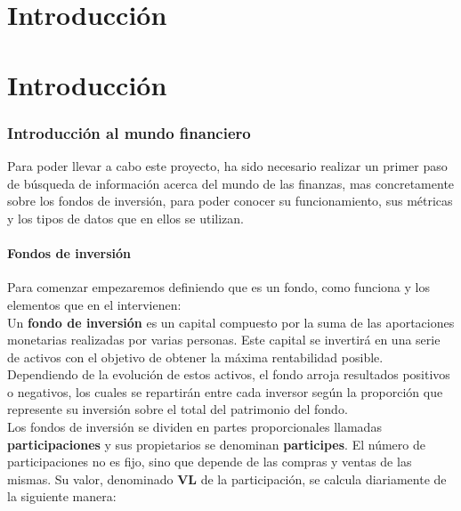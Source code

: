 \documentclass[12pt, a4paper]{article}
\newcommand*\parttitle{}
\let\origpart\part
\renewcommand*{\part}[2][]{%
	\ifx\\#1\\%
	\origpart{#2}%
	\renewcommand*\parttitle{#2}%
	\else
	\origpart[#1]{#2}%
	\renewcommand*\parttitle{#1}%
	\fi
}
\begin{document}
\newpage
\tableofcontents
\newpage

\part{Introducción}
\section{Introducción al mundo financiero}
Para poder llevar a cabo este proyecto, ha sido necesario realizar un primer paso de búsqueda de información acerca del mundo de las finanzas, mas concretamente sobre los fondos de inversión, para poder conocer su funcionamiento, sus métricas y los tipos de datos que en ellos se utilizan.\\

\subsection{Fondos de inversión}

Para comenzar empezaremos definiendo que es un fondo, como funciona y los elementos que en el intervienen:\\

Un \textbf{fondo de inversión} es un capital compuesto por la suma de las aportaciones monetarias realizadas por varias personas. Este capital se invertirá en una serie de activos con el objetivo de obtener la máxima rentabilidad posible. Dependiendo de la evolución de estos activos, el fondo arroja resultados positivos o negativos, los cuales se repartirán entre cada inversor según la proporción que represente su inversión sobre el total del patrimonio del fondo.\\

Los fondos de inversión se dividen en partes proporcionales llamadas \textbf{participaciones} y sus propietarios se denominan \textbf{participes}. El número de participaciones no es fijo, sino que depende de las compras y ventas de las mismas. Su valor, denominado \textbf{\gls{VL}} de la participación, se calcula diariamente de la siguiente manera: 
	
\end{document}
